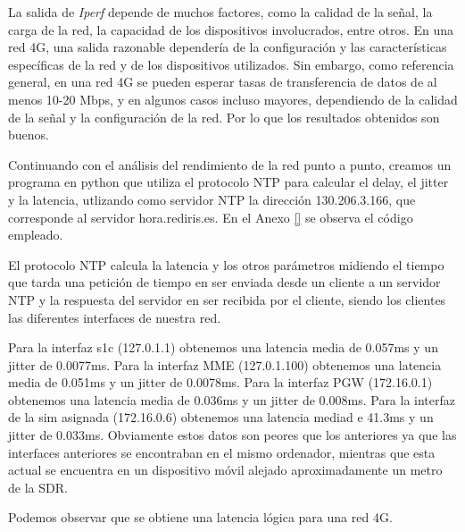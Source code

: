 La salida de \textit{Iperf} depende de muchos factores, como la calidad de la señal, la carga de la red, la capacidad de los dispositivos involucrados, entre otros.
En una red 4G, una salida razonable dependería de la configuración y las características específicas de la red y de los dispositivos utilizados. Sin embargo, como referencia general, en una red 4G se pueden esperar tasas de transferencia de datos de al menos 10-20 Mbps, y en algunos casos incluso mayores, dependiendo de la calidad de la señal y la configuración de la red. Por lo que los resultados obtenidos son buenos. 

Continuando con el análisis del rendimiento de la red punto a punto, creamos un programa en python que utiliza el protocolo NTP para calcular el delay, el jitter y la latencia, utlizando como servidor NTP la dirección 130.206.3.166, que corresponde al servidor hora.rediris.es. En el Anexo \ref{} se observa el código empleado.

El protocolo NTP calcula la latencia y los otros parámetros midiendo el tiempo que tarda una petición de tiempo en ser enviada desde un cliente a un servidor NTP y la respuesta del servidor en ser recibida por el cliente, siendo los clientes las diferentes interfaces de nuestra red.

Para la interfaz s1c (127.0.1.1) obtenemos una latencia media de 0.057ms y un jitter de 0.0077ms.
Para la interfaz MME (127.0.1.100) obtenemos una latencia media de 0.051ms y un jitter de 0.0078ms.
Para la interfaz PGW (172.16.0.1) obtenemos una latencia media de 0.036ms y un jitter de 0.008ms.
Para la interfaz de la sim asignada (172.16.0.6) obtenemos una latencia mediad e 41.3ms y un jitter de 0.033ms. Obviamente estos datos son peores que los anteriores ya que las interfaces anteriores se encontraban en el mismo ordenador, mientras que esta actual se encuentra en un dispositivo móvil alejado aproximadamente un metro de la SDR.

Podemos observar que se obtiene una latencia lógica para una red 4G.

